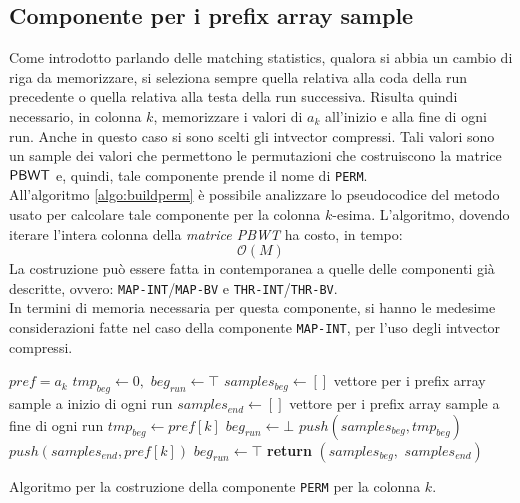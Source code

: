 \subsection{Componente per i prefix array sample}
Come introdotto parlando delle matching statistics, qualora si abbia un
cambio di riga da memorizzare, si seleziona sempre quella relativa alla coda
della run precedente o quella relativa alla testa della run successiva. Risulta
quindi necessario, in colonna $k$, memorizzare i valori di $a_k$ all'inizio e
alla fine di ogni run. Anche in questo caso si sono scelti gli intvector
compressi. Tali valori sono un sample dei valori che permettono 
le permutazioni che costruiscono la matrice $\mbox{\rm {\sf PBWT}}$ e, quindi, tale
componente prende il nome di \texttt{PERM}.\\
All'algoritmo \ref{algo:buildperm} è possibile analizzare lo pseudocodice del
metodo usato per calcolare tale componente per la colonna
$k$-esima. L'algoritmo, dovendo iterare l'intera colonna della \textit{matrice
  PBWT} ha costo, in tempo:
\begin{equation}
  \label{eq:timeperm}
  \mathcal{O}(M)
\end{equation}
La costruzione può essere fatta in contemporanea a quelle delle componenti già
descritte, ovvero: 
\texttt{MAP-INT}/\texttt{MAP-BV} e \texttt{THR-INT}/\texttt{THR-BV}.\\
\noindent
In termini di memoria necessaria per questa componente, si hanno le medesime
considerazioni fatte nel caso della componente \texttt{MAP-INT}, per l'uso degli
intvector compressi.
\begin{algorithm}
  \small
  \begin{algorithmic}[1]
    \Comment $pref = a_k$
    \State $tmp_{beg}\gets 0,\,\,beg_{run}\gets \top$
    \State $samples_{beg} \gets []$
    \Comment vettore per i prefix array sample a inizio di ogni run
    \State $samples_{end}\gets []$
    \Comment vettore per i prefix array sample a fine di ogni run
    \For {\textit{every} $k\in\left[0,\,\, height\right)$}
    \State $tmp_{beg}\gets pref[k]$
    \State $beg_{run}\gets \bot$
    \EndIf
    \State $push(samples_{beg}, tmp_{beg})$
    \State $push(samples_{end}, pref[k])$
    \State $beg_{run}\gets \top$
    \EndIf
    \EndFor
    \State \textbf{return} $(samples_{beg},\,\, samples_{end})$  
    \EndFunction
  \end{algorithmic}
  \caption{{\footnotesize{Algoritmo per la costruzione della componente
  \texttt{PERM} per la colonna $k$.}}}
  \label{algo:buildperm}
\end{algorithm}